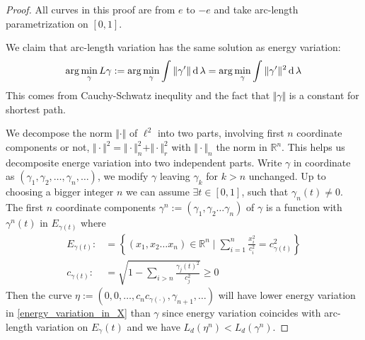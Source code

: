 \begin{proof}
	All curves in this proof are from $e$ to $-e$ and take arc-length parametrization on $[0,1]$.

	We claim that arc-length variation has the same solution as energy variation:
	\begin{equation}
		\label{energy_variation_in_X}
		\arg \min_{\gamma} L\gamma := \arg \min_{\gamma} \int \Vert \gamma^\prime \Vert \operatorname{d} \lambda = \arg \min_{\gamma} \int \Vert \gamma^\prime \Vert ^2 \operatorname{d} \lambda
	\end{equation}
	This comes from Cauchy-Schwatz inequlity and the fact that $\Vert \gamma \Vert$ is a constant for shortest path.

	We decompose the norm $\Vert \cdot \Vert$ of $\ell^2$ into two parts, involving first $n$ coordinate components or not, $\Vert \cdot \Vert^2 = \Vert \cdot \Vert_n^2 + \Vert \cdot \Vert_r^2$ with $\Vert \cdot \Vert_n$ the norm in $\mathbb{R} ^n $. This helps us decomposite energe variation into two independent parts. Write $\gamma$ in coordinate as $(\gamma_1, \gamma_2, \ldots, \gamma_n, \ldots)$, we modify $\gamma$ leaving $\gamma_k$ for $ k > n$ unchanged. Up to choosing a bigger integer $n$ we can assume $ \exists t \in [0,1]$, such that $\gamma_n(t) \neq 0$. The first $n$ coordinate components $\gamma^n := (\gamma_1, \gamma_2 \ldots \gamma_n)$ of $\gamma$ is a function with $\gamma^n(t)$ in $E_{\gamma(t)}$ where
	\begin{align*}
		E_{\gamma(t)} : & = \left\{ (x_1,x_2 \ldots x_n) \in \mathbb{R}^n \mid \sum_{i=1}^n \frac{x_i^2}{ c_i^2} = c_{\gamma(t)}^2\right\} \\
		c_{\gamma(t)}:  & =\sqrt{ 1- \sum_{i > n} \frac{\gamma_j(t)^2}{c_j^2}} \geq 0
	\end{align*}
	Then the curve $\eta := (0,0,\ldots, c_n c_{\gamma(\cdot)},\gamma_{n+1},\ldots)$ will have lower energy variation in \cref{energy_variation_in_X} than $\gamma$ since energy variation coincides with arc-length variation on $E_\gamma(t)$ and we have $L_d(\eta^n)< L_d({\gamma}^n)$.
\end{proof}

